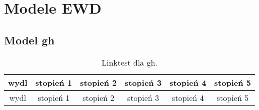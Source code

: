 \documentclass[]{article}
\begin{document}
\section{Modele EWD}\label{Modele-EWD}

\subsection{Model gh}\label{gh}

\begin{longtable}[c]{@{}cccccc@{}}
\caption{Linktest dla gh.}\tabularnewline
\toprule
\begin{minipage}[b]{0.08\columnwidth}\centering\strut
wydl
\strut\end{minipage} &
\begin{minipage}[b]{0.14\columnwidth}\centering\strut
stopień 1
\strut\end{minipage} &
\begin{minipage}[b]{0.14\columnwidth}\centering\strut
stopień 2
\strut\end{minipage} &
\begin{minipage}[b]{0.14\columnwidth}\centering\strut
stopień 3
\strut\end{minipage} &
\begin{minipage}[b]{0.14\columnwidth}\centering\strut
stopień 4
\strut\end{minipage} &
\begin{minipage}[b]{0.14\columnwidth}\centering\strut
stopień 5
\strut\end{minipage}\tabularnewline
\midrule
\endfirsthead
\toprule
\begin{minipage}[b]{0.08\columnwidth}\centering\strut
wydl
\strut\end{minipage} &
\begin{minipage}[b]{0.14\columnwidth}\centering\strut
stopień 1
\strut\end{minipage} &
\begin{minipage}[b]{0.14\columnwidth}\centering\strut
stopień 2
\strut\end{minipage} &
\begin{minipage}[b]{0.14\columnwidth}\centering\strut
stopień 3
\strut\end{minipage} &
\begin{minipage}[b]{0.14\columnwidth}\centering\strut
stopień 4
\strut\end{minipage} &
\begin{minipage}[b]{0.14\columnwidth}\centering\strut
stopień 5
\strut\end{minipage}\tabularnewline

\end{longtable}
\end{document}

